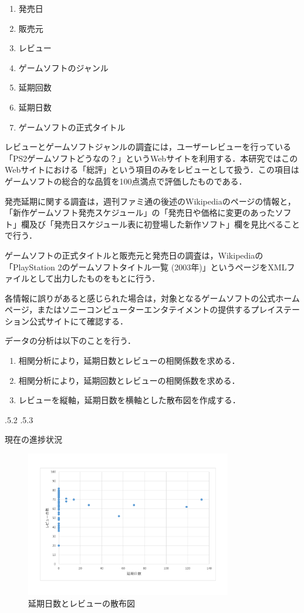 \documentclass[uplatex]{jsarticle}
\makeatletter
\renewcommand{\section}{%
    \if@slide\clearpage\fi
    \@startsection{section}{1}{\z@}%
    {\Cvs \@plus.5\Cdp \@minus.2\Cdp}%
    {.5\Cvs \@plus.3\Cdp}%
    {\normalfont\raggedright}}
\makeatother
\begin{document}
\begin{enumerate}
\item 発売日
\item 販売元
\item レビュー
\item ゲームソフトのジャンル
\item 延期回数
\item 延期日数
\item ゲームソフトの正式タイトル
\end{enumerate}

レビューとゲームソフトジャンルの調査には，ユーザーレビューを行っている「PS2ゲームソフトどうなの？」というWebサイトを利用する．本研究ではこのWebサイトにおける「総評」という項目のみをレビューとして扱う．この項目はゲームソフトの総合的な品質を100点満点で評価したものである\cite{review}．

発売延期に関する調査は，週刊ファミ通の後述のWikipediaのページの情報と，「新作ゲームソフト発売スケジュール」の「発売日や価格に変更のあったソフト」欄及び「発売日スケジュール表に初登場した新作ソフト」欄を見比べることで行う\cite{fami}．

ゲームソフトの正式タイトルと販売元と発売日の調査は，Wikipediaの「PlayStation 2のゲームソフトタイトル一覧 (2003年)」というページをXMLファイルとして出力したものをもとに行う\cite{wiki}．

各情報に誤りがあると感じられた場合は，対象となるゲームソフトの公式ホームページ，またはソニーコンピューターエンタテイメントの提供するプレイステーション公式サイトにて確認する．

データの分析は以下のことを行う．

\begin{enumerate}
\item 相関分析により，延期日数とレビューの相関係数を求める．
\item 相関分析により，延期回数とレビューの相関係数を求める．
\item レビューを縦軸，延期日数を横軸とした散布図を作成する．
\end{enumerate}


\section{現在の進捗状況}

\begin{figure}
\vspace*{-\intextsep}
\includegraphics[width=9cm,clip]{sanpu.pdf}
\caption{延期日数とレビューの散布図}\label{散布図}
\end{figure}
\end{document}
